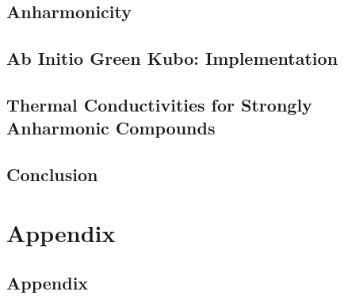 \documentclass[nobib,a4paper,twoside,notoc,justified,marginals=justified]{tufte-book}
\begin{document}
\chapter{Anharmonicity}


\chapter{Ab Initio Green Kubo: Implementation}


\chapter{Thermal Conductivities for Strongly Anharmonic Compounds}



\chapter{Conclusion}


\cleardoublepage
{}
{}





\part*{Appendix}

\newcommand{\bibsection}{\section{Bibliography}} %

\begin{appendices}
  \part*{Appendix}
  
\end{appendices}

\end{document}
